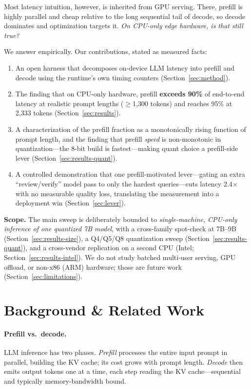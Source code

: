 \documentclass[10pt,twocolumn]{article}
\begin{document}
Most latency intuition, however, is inherited from GPU serving. There,
prefill is highly parallel and cheap relative to the long sequential tail
of decode, so decode dominates and optimization targets it. \emph{On
CPU-only edge hardware, is that still true?}

We answer empirically. Our contributions, stated as measured facts:
\begin{enumerate}
  \item An open harness that decomposes on-device LLM latency into prefill
        and decode using the runtime's own timing counters
        (Section~\ref{sec:method}).
  \item The finding that on CPU-only hardware, prefill \textbf{exceeds
        90\%} of end-to-end latency at realistic prompt lengths
        ($\geq$1{,}300 tokens) and reaches 95\% at 2{,}333 tokens
        (Section~\ref{sec:results}).
  \item A characterization of the prefill fraction as a monotonically
        rising function of prompt length, and the finding that prefill
        \emph{speed} is non-monotonic in quantization---the 8-bit build is
        fastest---making quant choice a prefill-side lever
        (Section~\ref{sec:results-quant}).
  \item A controlled demonstration that one prefill-motivated lever---gating
        an extra ``review/verify'' model pass to only the hardest
        queries---cuts latency 2.4$\times$ with no measurable quality loss,
        translating the measurement into a deployment win
        (Section~\ref{sec:lever}).
\end{enumerate}

\noindent\textbf{Scope.} The main sweep is deliberately bounded to
\emph{single-machine, CPU-only inference of one quantized 7B model}, with a
cross-family spot-check at 7B--9B (Section~\ref{sec:results-size}), a
Q4/Q5/Q8 quantization sweep (Section~\ref{sec:results-quant}), and a
cross-vendor replication on a second CPU (Intel;
Section~\ref{sec:results-intel}). We do not study batched multi-user serving,
GPU offload, or non-x86 (ARM) hardware; those are future work
(Section~\ref{sec:limitations}).

\section{Background \& Related Work}
\label{sec:background}

\paragraph{Prefill vs.\ decode.}
LLM inference has two phases. \emph{Prefill} processes the entire input
prompt in parallel, building the KV cache; its cost grows with prompt
length. \emph{Decode} then emits output tokens one at a time, each step
reading the KV cache---sequential and typically memory-bandwidth bound.
\end{document}
